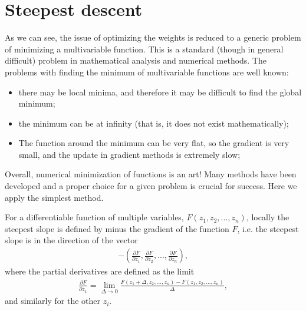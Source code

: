 \documentclass[letterpaper,10pt,english]{jupyterBook}
\begin{document}
\section{Steepest descent}
\label{\detokenize{docs/backprop:steepest-descent}}
\sphinxAtStartPar
As we can see, the issue of optimizing the weights is reduced to a generic problem of minimizing a multi\sphinxhyphen{}variable function. This is a standard (though in general difficult) problem in mathematical analysis and numerical methods. The problems with finding the minimum of multivariable functions are well known:
\begin{itemize}
\item {} 
\sphinxAtStartPar
there may be local minima, and therefore it may be difficult to find the global minimum;

\item {} 
\sphinxAtStartPar
the minimum can be at infinity (that is, it does not exist mathematically);

\item {} 
\sphinxAtStartPar
The function around the minimum can be very flat, so the gradient is very small, and the update in gradient methods is extremely slow;

\end{itemize}

\sphinxAtStartPar
Overall, numerical minimization of functions is an art! Many methods have been developed and a proper choice for a given problem is crucial for success. Here we apply the simplest  method.

\sphinxAtStartPar
For a differentiable function of multiple variables, \( F (z_1, z_2, ..., z_n) \), locally the steepest slope is defined by minus the gradient of the function \( F \), i.e. the steepest slope is in the direction of the vector
\begin{equation*}
\begin{split}-\left (\frac{\partial F}{\partial z_1}, \frac{\partial F}{\partial z_2}, ..., 
\frac{\partial F}{\partial z_n} \right ), \end{split}
\end{equation*}
\sphinxAtStartPar
where the partial derivatives are defined as the limit
\begin{equation*}
\begin{split}\frac{\partial F}{\partial z_1} =  \lim _ {\Delta \to 0} \frac {F (z_1 + \Delta, z_2, ..., z_n) -F (z_1, z_2, ..., z_n)} { \Delta}, \end{split}
\end{equation*}
\sphinxAtStartPar
and similarly for the other \( z_i \).
\end{document}
